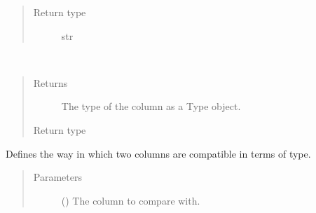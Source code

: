 \documentclass[letterpaper,10pt,english]{sphinxmanual}
\begin{document}
\begin{fulllineitems}
\begin{fulllineitems}
\begin{quote}
\begin{description}
\item[{Return type}] \leavevmode
\sphinxAtStartPar
str

\end{description}\end{quote}

\end{fulllineitems}


\begin{fulllineitems}
\label{\detokenize{model:mini_sql.model.column.Column.get_type}}~\begin{quote}\begin{description}
\item[{Returns}] \leavevmode
\sphinxAtStartPar
The type of the column as a Type object.

\item[{Return type}] \leavevmode
\sphinxAtStartPar
{\hyperref[\detokenize{model:mini_sql.model.type.Type}]{}}

\end{description}\end{quote}

\end{fulllineitems}


\begin{fulllineitems}
\label{\detokenize{model:mini_sql.model.column.Column.is_compatible}}
\sphinxAtStartPar
Defines the way in which two columns are compatible
in terms of type.
\begin{quote}\begin{description}
\item[{Parameters}] \leavevmode
\sphinxAtStartPar
{} ({\hyperref[\detokenize{model:mini_sql.model.column.Column}]{}}) \textendash{} The column to compare with.


\end{description}
\end{quote}
\end{fulllineitems}
\end{fulllineitems}
\end{document}
